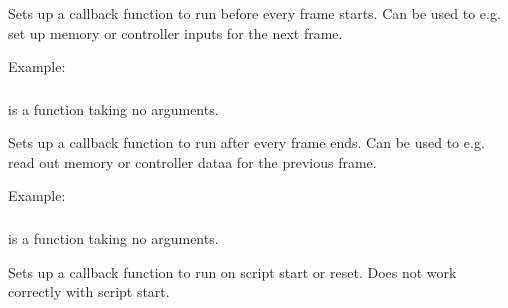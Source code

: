 \documentclass[letterpaper,10pt,english]{sphinxmanual}
\begin{document}
\sphinxAtStartPar
Sets up a callback function to run before every frame starts. Can be used to e.g. set up memory or controller inputs for the next frame.

\sphinxAtStartPar
Example:

\begin{sphinxVerbatim}[commandchars=\\\{\}]
 

\end{sphinxVerbatim}


\subsubsection{}
\label{\detokenize{mods:emu-registerafter-func}}\label{\detokenize{mods:registerafter}}
\sphinxAtStartPar
{} is a function taking no arguments.

\sphinxAtStartPar
Sets up a callback function to run after every frame ends. Can be used to e.g. read out memory or controller dataa for the previous frame.

\sphinxAtStartPar
Example:

\begin{sphinxVerbatim}[commandchars=\\\{\}]
 

\end{sphinxVerbatim}


\subsubsection{}
\label{\detokenize{mods:emu-registerstart-func}}\label{\detokenize{mods:registerstart}}
\sphinxAtStartPar
{} is a function taking no arguments.

\sphinxAtStartPar
Sets up a callback function to run on script start or reset. Does not work correctly with script start.
\end{document}
